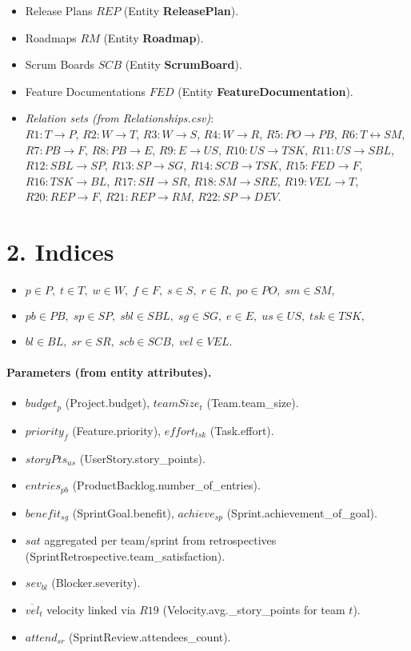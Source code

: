 \documentclass[11pt]{article}
\begin{document}
\begin{itemize}
  \item Release Plans $REP$ (Entity \textbf{ReleasePlan}).
  \item Roadmaps $RM$ (Entity \textbf{Roadmap}).
  \item Scrum Boards $SCB$ (Entity \textbf{ScrumBoard}).
  \item Feature Documentations $FED$ (Entity \textbf{FeatureDocumentation}).
  \item \emph{Relation sets (from Relationships.csv)}: \\
  $R1:T\to P$, $R2:W\to T$, $R3:W\to S$, $R4:W\to R$, $R5:PO\to PB$, $R6:T\leftrightarrow SM$, $R7:PB\to F$, $R8:PB\to E$, $R9:E\to US$, $R10:US\to TSK$, $R11:US\to SBL$, $R12:SBL\to SP$, $R13:SP\to SG$, $R14:SCB\to TSK$, $R15:FED\to F$, $R16:TSK\to BL$, $R17:SH\to SR$, $R18:SM\to SRE$, $R19:VEL\to T$, $R20:REP\to F$, $R21:REP\to RM$, $R22:SP\to DEV$.
\end{itemize}

\section{2. Indices}
\begin{itemize}
  \item $p\in P,\; t\in T,\; w\in W,\; f\in F,\; s\in S,\; r\in R,\; po\in PO,\; sm\in SM,$
  \item $pb\in PB,\; sp\in SP,\; sbl\in SBL,\; sg\in SG,\; e\in E,\; us\in US,\; tsk\in TSK,$
  \item $bl\in BL,\; sr\in SR,\; scb\in SCB,\; vel\in VEL$.
\end{itemize}

\paragraph{Parameters (from entity attributes).}
\begin{itemize}
  \item $budget_p$ (Project.budget), $teamSize_t$ (Team.team\_size).
  \item $priority_f$ (Feature.priority), $effort_{tsk}$ (Task.effort).
  \item $storyPts_{us}$ (UserStory.story\_points).
  \item $entries_{pb}$ (ProductBacklog.number\_of\_entries).
  \item $benefit_{sg}$ (SprintGoal.benefit), $achieve_{sp}$ (Sprint.achievement\_of\_goal).
  \item $sat$ aggregated per team/sprint from retrospectives (SprintRetrospective.team\_satisfaction).
  \item $sev_{bl}$ (Blocker.severity).
  \item $\overline{vel}_t$ velocity linked via $R19$ (Velocity.avg.\_story\_points for team $t$).
  \item $attend_{sr}$ (SprintReview.attendees\_count).
\end{itemize}
\end{document}
